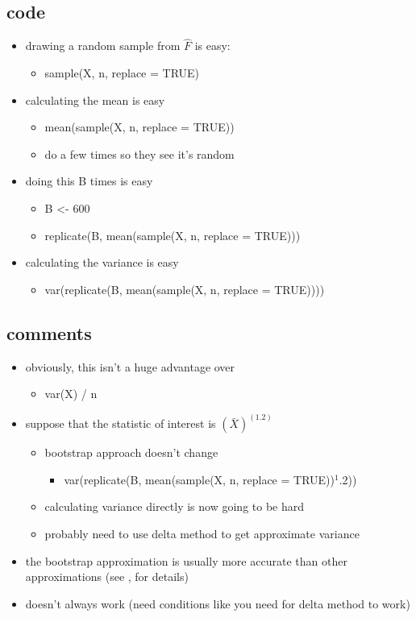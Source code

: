 \subsection{code}

\begin{itemize}
\item drawing a random sample from $\hat F$ is easy:
\begin{itemize}
\item sample(X, n, replace = TRUE)
\end{itemize}
\item calculating the mean is easy
\begin{itemize}
\item mean(sample(X, n, replace = TRUE))
\item do a few times so they see it's random
\end{itemize}
\item doing this B times is easy
\begin{itemize}
\item B <- 600
\item replicate(B, mean(sample(X, n, replace = TRUE)))
\end{itemize}
\item calculating the variance is easy
\begin{itemize}
\item var(replicate(B, mean(sample(X, n, replace = TRUE))))
\end{itemize}
\end{itemize}

\subsection{comments}

\begin{itemize}
\item obviously, this isn't a huge advantage over
\begin{itemize}
\item var(X) / n
\end{itemize}
\item suppose that the statistic of interest is $(\bar X)^(1.2)$
\begin{itemize}
\item bootstrap approach doesn't change
\begin{itemize}
\item var(replicate(B, mean(sample(X, n, replace = TRUE))$^1$.2))
\end{itemize}
\item calculating variance directly is now going to be hard
\item probably need to use delta method to get approximate variance
\end{itemize}
\item the bootstrap approximation is usually more accurate than
       other approximations (see \citealp{Hal_1991}, for details)
\item doesn't always work (need conditions like you need for delta
       method to work)
\end{itemize}

